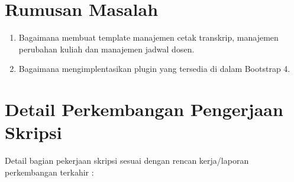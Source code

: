 \documentclass[a4paper,twoside]{article}
\begin{document}
\section{Rumusan Masalah}
\begin{enumerate}
	\item Bagaimana membuat template manajemen cetak transkrip, manajemen perubahan kuliah dan manajemen jadwal dosen.
	\item Bagaimana mengimplentasikan plugin yang tersedia di dalam Bootstrap 4.	
\end{enumerate}

\section{Detail Perkembangan Pengerjaan Skripsi}
Detail bagian pekerjaan skripsi sesuai dengan rencan kerja/laporan perkembangan terkahir :
\end{document}
